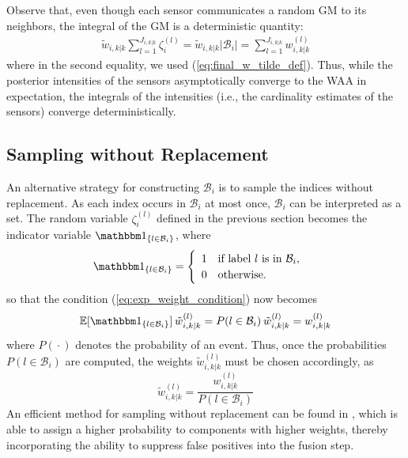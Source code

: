 Observe that, even though each sensor communicates a random GM to its neighbors, the integral of the GM is a deterministic quantity:
\begin{align}   
\tilde w_{i,k|k} \sum_{l=1}^{J_{i,k|k}}\zeta^{(l)}_{i} = \tilde w_{i,k|k} |\mathcal B_i| = \sum_{l=1}^{J_{i,k|k}} w^{(l)}_{i,k|k}
\end{align}
where in the second equality, we used (\ref{eq:final_w_tilde_def}).
Thus, while the posterior intensities of the sensors asymptotically converge to the WAA in expectation, the integrals of the intensities (i.e., the cardinality estimates of the sensors) converge deterministically.

\subsection{Sampling without Replacement}
An alternative strategy for constructing $\mathcal B_i$ is to sample the indices without replacement. As each index occurs in $\mathcal B_i$ at most once, $\mathcal B_i$ can be interpreted as a set. The random variable $\zeta^{(l)}_{i}$ defined in the previous section becomes the indicator variable $\mathbbm 1_{\lbrace l\in \mathcal B_i \rbrace}$, where
\begin{align}
    \mathbbm 1_{\lbrace l\in \mathcal B_i \rbrace} = \begin{cases}
    \begin{array}{cl}
         1& \text{if label}\ l\ \text{is in }\mathcal B_i,  \\
         0& \text{otherwise.}
    \end{array}
    \end{cases}
\end{align}
so that the condition (\ref{eq:exp_weight_condition}) now becomes
\begin{equation}
    \mathbb E[\mathbbm 1_{\lbrace l\in \mathcal B_i \rbrace}]\hspace{2pt}\tilde w^{(l)}_{i,k|k} = P (l\in \mathcal B_i )\hspace{2pt}\tilde w^{(l)}_{i,k|k} = w^{(l)}_{i,k|k} 
\end{equation}
where $P({}\cdot{})$ denotes the probability of an event. Thus, once the 
probabilities $P (l\in \mathcal B_i )$ are computed,
the weights $\tilde w^{(l)}_{i,k|k}$ must be chosen accordingly, as
\begin{equation}
    \tilde w^{(l)}_{i,k|k} = \frac{w^{(l)}_{i,k|k}}{P( l\in \mathcal B_i )}
    \label{eq:no_replacement_weights}
\end{equation}
An efficient method for sampling without replacement can be found in \cite{Efraimidis2015}, which is able to assign a higher probability to components with higher weights, thereby incorporating the ability to suppress false positives into the fusion step.

